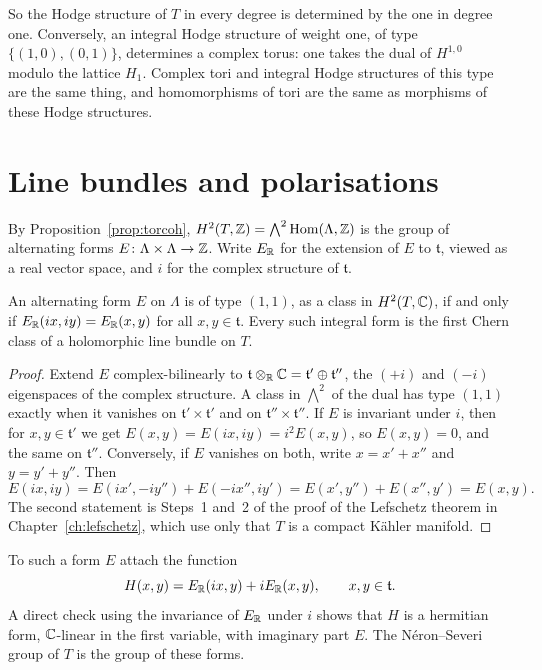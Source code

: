 So the Hodge structure of $T$ in every degree is determined by the one in
degree one. Conversely, an integral Hodge structure of weight one, of
type $\{(1,0),(0,1)\}$, determines a complex torus: one takes the dual of
$H^{1,0}$ modulo the lattice $H_{1}$. Complex tori and integral Hodge
structures of this type are the same thing, and homomorphisms of tori are
the same as morphisms of these Hodge structures.

\section{Line bundles and polarisations}

By Proposition~\ref{prop:torcoh}, $H^{2}(T,\mathbb{Z})=\bigwedge^{2}\operatorname{Hom}(\Lambda,\mathbb{Z})$
is the group of alternating forms $E\colon\Lambda\times\Lambda\to\mathbb{Z}$. Write
$E_{\mathbb{R}}$ for the extension of $E$ to $\mathfrak{t}$, viewed as a real vector space,
and $i$ for the complex structure of $\mathfrak{t}$.

\begin{proposition}\label{prop:ns}
An alternating form $E$ on $\Lambda$ is of type $(1,1)$, as a class in
$H^{2}(T,\mathbb{C})$, if and only if $E_{\mathbb{R}}(ix,iy)=E_{\mathbb{R}}(x,y)$ for all
$x,y\in \mathfrak{t}$. Every such integral form is the first Chern class of a
holomorphic line bundle on $T$.
\end{proposition}

\begin{proof}
Extend $E$ complex-bilinearly to $\mathfrak{t}\otimes_{\mathbb{R}}\mathbb{C}=\mathfrak{t}'\oplus \mathfrak{t}''$, the
$(+i)$ and $(-i)$ eigenspaces of the complex structure. A class in
$\bigwedge^{2}$ of the dual has type $(1,1)$ exactly when it vanishes on
$\mathfrak{t}'\times \mathfrak{t}'$ and on $\mathfrak{t}''\times \mathfrak{t}''$. If $E$ is invariant under $i$, then for
$x,y\in \mathfrak{t}'$ we get $E(x,y)=E(ix,iy)=i^{2}E(x,y)$, so $E(x,y)=0$, and the
same on $\mathfrak{t}''$. Conversely, if $E$ vanishes on both, write $x=x'+x''$ and
$y=y'+y''$. Then
\[
  E(ix,iy)=E(ix',-iy'')+E(-ix'',iy')=E(x',y'')+E(x'',y')=E(x,y).
\]
The second statement is Steps~1 and~2 of the proof of the Lefschetz
theorem in Chapter~\ref{ch:lefschetz}, which use only that $T$ is a
compact K\"ahler manifold.
\end{proof}

To such a form $E$ attach the function
\[
  H(x,y)=E_{\mathbb{R}}(ix,y)+iE_{\mathbb{R}}(x,y),\qquad x,y\in \mathfrak{t}.
\]
A direct check using the invariance of $E_{\mathbb{R}}$ under $i$ shows that $H$
is a hermitian form, $\mathbb{C}$-linear in the first variable, with imaginary
part $E$. The N\'eron--Severi group of $T$ is the group of these forms.

